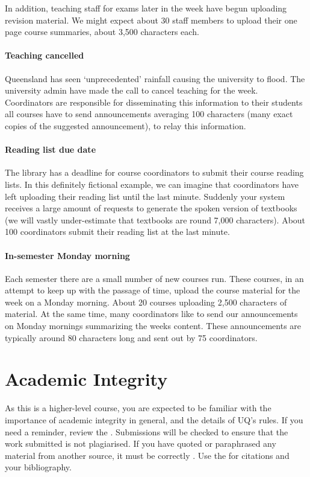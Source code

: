 \documentclass{csse4400}
\begin{document}
In addition, teaching staff for exams later in the week have begun uploading revision material.
We might expect about 30 staff members to upload their one page course summaries,
about 3,500 characters each.

\paragraph{Teaching cancelled}
Queensland has seen `unprecedented' rainfall causing the university to flood.
The university admin have made the call to cancel teaching for the week.
Coordinators are responsible for disseminating this information to their students all  courses have to send announcements averaging 100 characters (many exact copies of the suggested announcement),
to relay this information.

\paragraph{Reading list due date}
The library has a deadline for course coordinators to submit their course reading lists.
In this definitely fictional example,
we can imagine that coordinators have left uploading their reading list until the last minute.
Suddenly your system receives a large amount of requests to generate the spoken version of textbooks (we will vastly under-estimate that textbooks are round 7,000 characters).
About 100 coordinators submit their reading list at the last minute.

\paragraph{In-semester Monday morning}
Each semester there are a small number of new courses run.
These courses, in an attempt to keep up with the passage of time,
upload the course material for the week on a Monday morning.
About 20 courses uploading 2,500 characters of material.
At the same time, many coordinators like to send our announcements on Monday mornings summarizing the weeks content.
These announcements are typically around 80 characters long and sent out by 75 coordinators.


\section{Academic Integrity}
As this is a higher-level course, you are expected to be familiar with the importance of academic integrity in general, and the details of UQ's rules.
If you need a reminder, review the .
Submissions will be checked to ensure that the work submitted is not plagiarised.
If you have quoted or paraphrased any material from another source, it must be correctly .
Use the  for citations and your bibliography.
\end{document}
